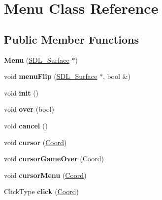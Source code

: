 \hypertarget{classMenu}{\section{Menu Class Reference}
\label{classMenu}
}
\subsection*{Public Member Functions}
\begin{DoxyCompactItemize}
\item 
\hypertarget{classMenu_a92892ab49e1d32a41bcf855c6c6f53a5}{{\bfseries Menu} (\hyperlink{structSDL__Surface}{S\+D\+L\+\_\+\+Surface} $\ast$)}\label{classMenu_a92892ab49e1d32a41bcf855c6c6f53a5}

\item 
\hypertarget{classMenu_a6c1d9dc9b01703563aced31f61a2f761}{void {\bfseries menu\+Flip} (\hyperlink{structSDL__Surface}{S\+D\+L\+\_\+\+Surface} $\ast$, bool \&)}\label{classMenu_a6c1d9dc9b01703563aced31f61a2f761}

\item 
\hypertarget{classMenu_a342d2a526a850dbf2d1aecd830b91287}{void {\bfseries init} ()}\label{classMenu_a342d2a526a850dbf2d1aecd830b91287}

\item 
\hypertarget{classMenu_a33cb6abd91466c27c91496df313ade9d}{void {\bfseries over} (bool)}\label{classMenu_a33cb6abd91466c27c91496df313ade9d}

\item 
\hypertarget{classMenu_af3730342c79adc2ba0dc8154e16f4e3c}{void {\bfseries cancel} ()}\label{classMenu_af3730342c79adc2ba0dc8154e16f4e3c}

\item 
\hypertarget{classMenu_a268edd9473291f0674d5d7af0e8f51e9}{void {\bfseries cursor} (\hyperlink{structCoord}{Coord})}\label{classMenu_a268edd9473291f0674d5d7af0e8f51e9}

\item 
\hypertarget{classMenu_a21bc0038665d6025c27af696109f101a}{void {\bfseries cursor\+Game\+Over} (\hyperlink{structCoord}{Coord})}\label{classMenu_a21bc0038665d6025c27af696109f101a}

\item 
\hypertarget{classMenu_af86d3c93a49bfd88c85e2c73fc874dc6}{void {\bfseries cursor\+Menu} (\hyperlink{structCoord}{Coord})}\label{classMenu_af86d3c93a49bfd88c85e2c73fc874dc6}

\item 
\hypertarget{classMenu_a1645db910cebcd8e18fd37dbc0c0a171}{Click\+Type {\bfseries click} (\hyperlink{structCoord}{Coord})}\label{classMenu_a1645db910cebcd8e18fd37dbc0c0a171}


\end{DoxyCompactItemize}
